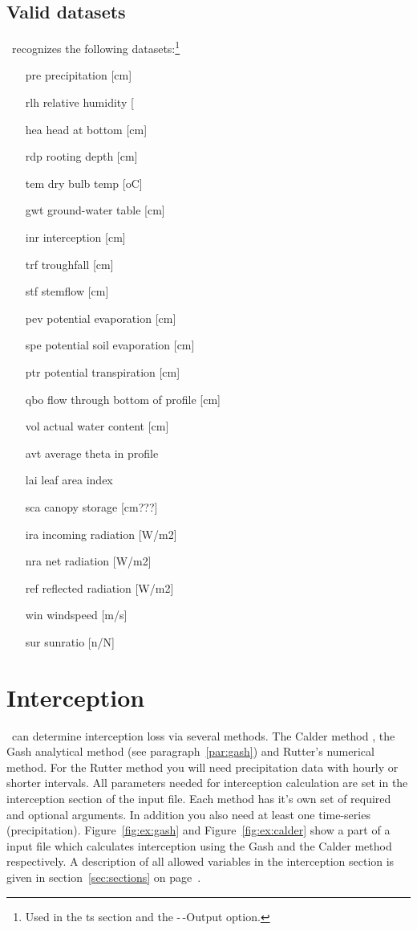 \subsection{Valid datasets}
\vamps\ recognizes the following datasets:\footnote{Used in the ts section
and the -\,-Output option.}
\begin{itemize}
\item[pre] precipitation [cm]
\item[rlh] relative humidity [%
\item[hea] head at bottom [cm] 
\item[rdp] rooting depth [cm] 
\item[tem] dry bulb temp [oC] 
\item[gwt] ground-water table [cm] 
\item[inr] interception [cm] 
\item[trf] troughfall   [cm] 
\item[stf] stemflow     [cm] 
\item[pev] potential evaporation [cm] 
\item[spe] potential soil evaporation [cm] 
\item[ptr] potential transpiration [cm] 
\item[qbo] flow through bottom of profile [cm] 
\item[vol] actual water content [cm] 
\item[avt] average theta in profile 
\item[lai] leaf area index 
\item[sca] canopy storage [cm???] 
\item[ira] incoming radiation [W/m2] 
\item[nra] net radiation [W/m2] 
\item[ref] reflected radiation [W/m2] 
\item[win] windspeed [m/s] 
\item[sur] sunratio [n/N] 
\end{itemize}

\section{Interception}
\vamps\ can determine interception loss via several methods. The
Calder method \cite{calder1986171}, the Gash analytical method (see
paragraph~\ref{par:gash}) and Rutter's
\cite{rutter1971174} numerical method. For the Rutter method you will need
precipitation data with hourly or shorter intervals.  All parameters
needed for interception calculation are set in the interception section
of the input file. Each method has it's own set of required and optional
arguments. In addition you also need at least one time-series
(precipitation). Figure~\ref{fig:ex:gash} and Figure~\ref{fig:ex:calder}
show a part of a input file which calculates interception using the Gash
and the Calder method respectively. A description of all allowed variables
in the interception section is given in section~\ref{sec:sections} on
page~\pageref{section:interception}.

